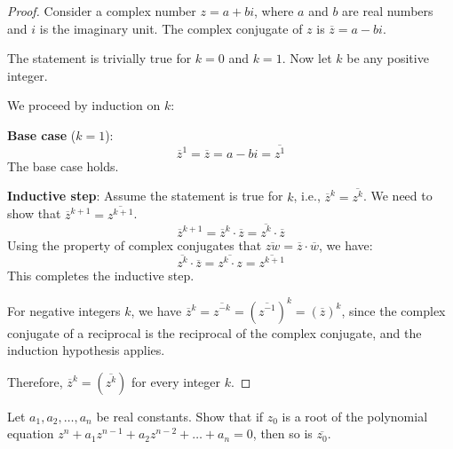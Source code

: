 \documentclass[
	12pt, %
	fleqn, %
	a4paper, %
]{LegrandOrangeBook}
\begin{document}
            \begin{proof}
            Consider a complex number \( z = a + bi \), where \( a \) and \( b \) are real numbers and \( i \) is the imaginary unit. The complex conjugate of \( z \) is \( \overline{z} = a - bi \).
            
            The statement is trivially true for \( k = 0 \) and \( k = 1 \). Now let \( k \) be any positive integer.
            
            We proceed by induction on \( k \):
            
            \textbf{Base case} (\( k = 1 \)):
            \[ \overline{z}^1 = \overline{z} = a - bi = \overline{z^1} \]
            The base case holds.
            
            \textbf{Inductive step}:
            Assume the statement is true for \( k \), i.e., \( \overline{z}^k = \overline{z^k} \). We need to show that \( \overline{z}^{k+1} = \overline{z^{k+1}} \).
            \[ \overline{z}^{k+1} = \overline{z}^k \cdot \overline{z} = \overline{z^k} \cdot \overline{z} \]
            Using the property of complex conjugates that \( \overline{zw} = \overline{z} \cdot \overline{w} \), we have:
            \[ \overline{z^k} \cdot \overline{z} = \overline{z^k \cdot z} = \overline{z^{k+1}} \]
            This completes the inductive step.
            
            For negative integers \( k \), we have \( \overline{z}^k = \overline{z^{-k}} = (\overline{z^{-1}})^k = (\overline{z})^k \), since the complex conjugate of a reciprocal is the reciprocal of the complex conjugate, and the induction hypothesis applies.
            
            Therefore, \( \overline{z}^k = (\overline{z^k}) \) for every integer \( k \).
            \end{proof}

            \begin{exercise}\label{conjugate root}
                Let \( a_1, a_2, \ldots, a_n \) be real constants. Show that if \( z_0 \) is a root of the polynomial equation \( z^n + a_1z^{n-1} + a_2z^{n-2} + \ldots + a_n = 0 \), then so is \( \overline{z_0} \).
                \end{exercise}
                
\end{document}
